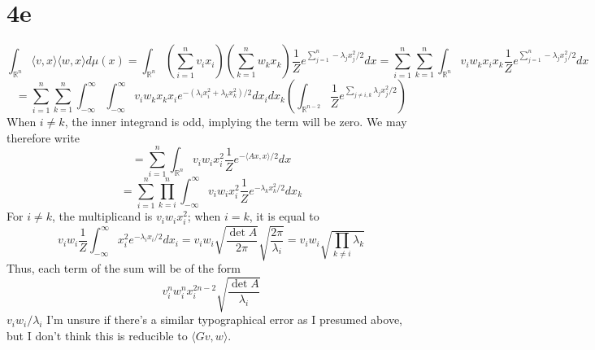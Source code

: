 \documentclass{article}
\begin{document}
\section*{4e}
\[
  \int_{\mathbb{R}^{n}}\langle v,x \rangle\langle w,x \rangle d\mu(x)
  =\int_{\mathbb{R}^{n}}\left( \sum_{i=1}^{n}v_{i}x_{i} \right)\left( \sum_{k=1}^{n}w_{k}x_{k} \right)
  \frac{1}{Z}e^{\sum_{j=1}^{n}-\lambda_{j}x_{j}^{2}/2}dx
  =\sum_{i=1}^{n}\sum_{k=1}^{n}\int_{\mathbb{R}^{n}}v_{i}w_{k}x_{i}x_{k}  \frac{1}{Z}e^{\sum_{j=1}^{n}-\lambda_{j}x_{j}^{2}/2}dx
\]
\[
  =\sum_{i=1}^{n}\sum_{k=1}^{n}\int_{-\infty}^{\infty}\int_{-\infty}^{\infty}v_{i}w_{k}x_{k}x_{i}e^{-(\lambda_{i} x_{i}^{2}+\lambda_{k}x_k^2)/2}dx_{i}dx_{k}
  \left( \int_{\mathbb{R}^{n-2}}\frac{1}{Z}e^{\sum_{j\neq i,k}\lambda_{j}x_{j}^{2}/2} \right)
\]
When $i\neq k$, the inner integrand is odd, implying the term will be zero.
We may therefore write
\[
  =\sum_{i=1}^{n}\int_{\mathbb{R}^{n}}v_{i}w_{i}x_{i}^{2}\frac{1}{Z}e^{-\langle Ax,x \rangle/2}dx
\]
\[
  =\sum_{i=1}^{n}\prod_{k=i}^{n}\int_{-\infty}^{\infty}v_{i}w_{i}x_{i}^{2}\frac{1}{Z}e^{-\lambda_{k}x_{k}^{2}/2}dx_{k}
\]
For $i\neq k$, the multiplicand is $v_{i}w_{i}x_{i}^{2}$; when $i=k$, it is equal to
\[
  v_{i}w_{i}\frac{1}{Z}\int_{-\infty}^{\infty}x_{i}^{2}e^{-\lambda_{i}x_{i}/2}dx_{i}
  =v_{i}w_{i}\sqrt{\frac{\det A}{2\pi}}\sqrt{\frac{2\pi}{\lambda_{i}}}
  =v_{i}w_{i}\sqrt{\prod_{k\neq i}\lambda_{k}}
\]
Thus, each term of the sum will be of the form
\[
  v_{i}^{n}w^{n}_{i}x_{i}^{2n-2}\sqrt{\frac{\det A}{\lambda_{i}}}
\]
$v_{i}w_{i}/\lambda_{i}$
I'm unsure if there's a similar typographical error as I presumed above, but I don't think this is reducible to $\langle Gv,w \rangle$.
\end{document}

